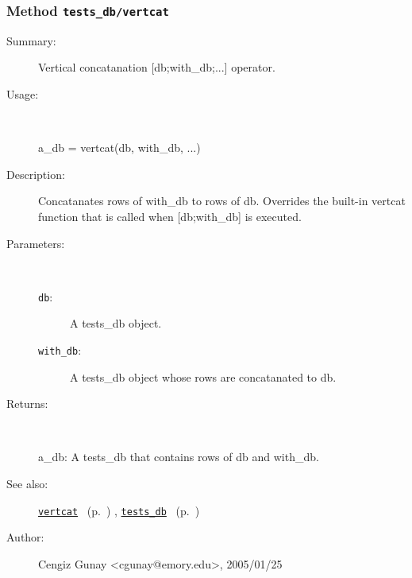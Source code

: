 \subsubsection[Method \texttt{vertcat}]{Method \texttt{tests\_db/vertcat}}%
%
\label{ref_tests_db__vertcat}%
\hypertarget{ref_tests_db__vertcat}{}%
\begin{description}
\item[Summary:]Vertical concatanation [db;with\_db;...] operator.
%
\item[Usage:]~%
\begin{lyxcode}%
a\_db = vertcat(db, with\_db, ...)
%
\end{lyxcode}%
%
\item[Description:]%
Concatanates rows of with\_db to rows of db. Overrides the built-in
 vertcat function that is called when [db;with\_db] is executed.
\item[Parameters:]~
\begin{description}%
\item[\texttt{db}:]
 A tests\_db object.
\item[\texttt{with\_db}:]
 A tests\_db object whose rows are concatanated to db.
\end{description}%
%
\item[Returns:]~

	a\_db: A tests\_db that contains rows of db and with\_db.
%
%
\item[See also:]%
\hyperlink{ref_vertcat}{\texttt{vertcat}}%
\ (p.~\pageref{ref_vertcat})%
%
, \hyperlink{ref_tests_db}{\texttt{tests\_db}}%
\ (p.~\pageref{ref_tests_db})%
%
%
\item[Author:]%
Cengiz Gunay <cgunay@emory.edu>, 2005/01/25%
\end{description}
\methodline%

